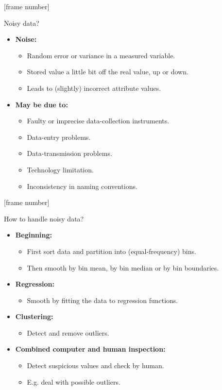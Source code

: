 \documentclass[aspectratio=169,t]{beamer}
\begin{document}
  {
    [frame number]
    \begin{frame}{Noisy data?}
    \begin{itemize}
      \item \textbf{\color{airforceblue}Noise:}
      \begin{itemize}
        \item Random error or variance in a measured variable.
        \item Stored value a little bit off the real value, up or down.
        \item Leads to (slightly) incorrect attribute values.
      \end{itemize}
      \item \textbf{May be due to:}
      \begin{itemize}
        \item Faulty or imprecise data-collection instruments.
        \item Data-entry problems.
        \item Data-transmission problems.
        \item Technology limitation.
        \item Inconsistency in naming conventions.
      \end{itemize}
    \end{itemize}
    \end{frame}
  }

  {
    [frame number]
    \begin{frame}{How to handle noisy data?}
    \begin{itemize}
        \item \textbf{Beginning:}
        \begin{itemize}
          \item First sort data and partition into (equal-frequency) bins.
          \item Then smooth by bin mean, by bin median or by bin boundaries.
        \end{itemize}
        \item \textbf{Regression:}
        \begin{itemize}
          \item Smooth by fitting the data to regression functions.
        \end{itemize}
        \item \textbf{Clustering:}
        \begin{itemize}
          \item Detect and remove outliers.
        \end{itemize}
        \item \textbf{Combined computer and human inspection:}
        \begin{itemize}
          \item Detect suspicious values and check by human.
          \item E.g. deal with possible outliers.
        \end{itemize}
    \end{itemize}
    \end{frame}
  }
\end{document}
